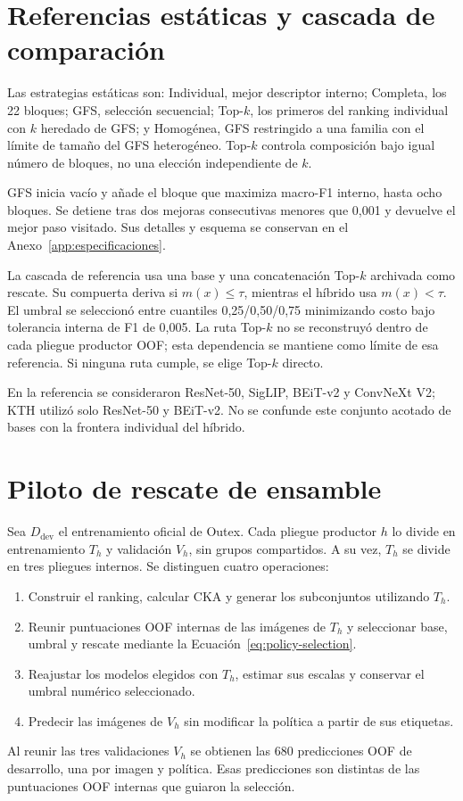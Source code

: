 

\section{Referencias estáticas y cascada de comparación}
\label{sec:comparadores}
Las estrategias estáticas son: Individual, mejor descriptor interno; Completa, los 22 bloques; GFS, selección secuencial; Top-$k$, los primeros del ranking individual con $k$ heredado de GFS; y Homogénea, GFS restringido a una familia con el límite de tamaño del GFS heterogéneo. Top-$k$ controla composición bajo igual número de bloques, no una elección independiente de $k$.

GFS inicia vacío y añade el bloque que maximiza macro-F1 interno, hasta ocho bloques. Se detiene tras dos mejoras consecutivas menores que 0,001 y devuelve el mejor paso visitado. Sus detalles y esquema se conservan en el Anexo~\ref{app:especificaciones}.

La cascada de referencia usa una base y una concatenación Top-$k$ archivada como rescate. Su compuerta deriva si $m(x)\le\tau$, mientras el híbrido usa $m(x)<\tau$. El umbral se seleccionó entre cuantiles 0,25/0,50/0,75 minimizando costo bajo tolerancia interna de F1 de 0,005. La ruta Top-$k$ no se reconstruyó dentro de cada pliegue productor OOF; esta dependencia se mantiene como límite de esa referencia. Si ninguna ruta cumple, se elige Top-$k$ directo.

En la referencia se consideraron ResNet-50, SigLIP, BEiT-v2 y ConvNeXt V2; KTH utilizó solo ResNet-50 y BEiT-v2. No se confunde este conjunto acotado de bases con la frontera individual del híbrido.

\section{Piloto de rescate de ensamble}
Sea $D_{\mathrm{dev}}$ el entrenamiento oficial de Outex. Cada pliegue productor $h$ lo divide en entrenamiento $T_h$ y validación $V_h$, sin grupos compartidos. A su vez, $T_h$ se divide en tres pliegues internos. Se distinguen cuatro operaciones:
\begin{enumerate}
\item Construir el ranking, calcular CKA y generar los subconjuntos utilizando $T_h$.
\item Reunir puntuaciones OOF internas de las imágenes de $T_h$ y seleccionar base, umbral y rescate mediante la Ecuación~\ref{eq:policy-selection}.
\item Reajustar los modelos elegidos con $T_h$, estimar sus escalas y conservar el umbral numérico seleccionado.
\item Predecir las imágenes de $V_h$ sin modificar la política a partir de sus etiquetas.
\end{enumerate}
Al reunir las tres validaciones $V_h$ se obtienen las 680 predicciones OOF de desarrollo, una por imagen y política. Esas predicciones son distintas de las puntuaciones OOF internas que guiaron la selección.

